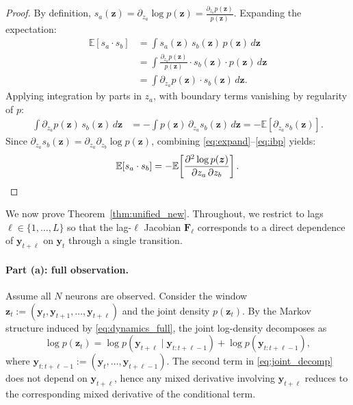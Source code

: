 \documentclass{article}
\theoremstyle{plain}
\theoremstyle{definition}
\theoremstyle{remark}
\newcommand{\E}{\mathbb{E}}
\newcommand{\1}{\mathbf{1}}
\newcommand{\y}{\bm{y}}
\newcommand{\z}{\bm{z}}
\begin{document}
\begin{proof}
By definition, $s_a(\z) = \partial_{z_a} \log p(\z) = \frac{\partial_{z_a} p(\z)}{p(\z)}$. Expanding the expectation:
\begin{align}
\E[s_a \cdot s_b]
&= \int s_a(\z)\, s_b(\z)\, p(\z)\, d\z \nonumber\\
&= \int \frac{\partial_{z_a} p(\z)}{p(\z)} \cdot s_b(\z) \cdot p(\z)\, d\z \nonumber\\
&= \int \partial_{z_a} p(\z) \cdot s_b(\z)\, d\z.
\label{eq:expand}
\end{align}
Applying integration by parts in $z_a$, with boundary terms vanishing by regularity of $p$:
\begin{align}
\int \partial_{z_a} p(\z)\, s_b(\z)\, d\z
&= -\int p(\z)\, \partial_{z_a} s_b(\z)\, d\z
= -\E[\partial_{z_a} s_b(\z)].
\label{eq:ibp}
\end{align}
Since $\partial_{z_a} s_b(\z) = \partial_{z_a}\partial_{z_b} \log p(\z)$, combining \eqref{eq:expand}--\eqref{eq:ibp} yields:
$$
\E[s_a \cdot s_b]
= -\E\!\left[\frac{\partial^2 \log p(\z)}{\partial z_a\, \partial z_b}\right]. \qedhere
$$
\end{proof}

We now prove Theorem~\ref{thm:unified_new}. Throughout, we restrict to lags $\ell \in \{1,\dots,L\}$ so that the lag-$\ell$ Jacobian $\bm{F}_\ell$ corresponds to a direct dependence of $\y_{t+\ell}$ on $\y_t$ through a single transition.

\paragraph{Part (a): full observation.}
Assume all $N$ neurons are observed. Consider the window $\z_t := (\y_t,\y_{t+1},\dots,\y_{t+\ell})$ and the joint density $p(\z_t)$. By the Markov structure induced by \eqref{eq:dynamics_full}, the joint log-density decomposes as
\begin{equation}
\log p(\z_t)
=
\log p(\y_{t+\ell} \mid \y_{t:t+\ell-1})
+
\log p(\y_{t:t+\ell-1}),
\label{eq:joint_decomp}
\end{equation}
where $\y_{t:t+\ell-1}:=(\y_t,\dots,\y_{t+\ell-1})$. The second term in \eqref{eq:joint_decomp} does not depend on $\y_{t+\ell}$, hence any mixed derivative involving $\y_{t+\ell}$ reduces to the corresponding mixed derivative of the conditional term.
\end{document}
